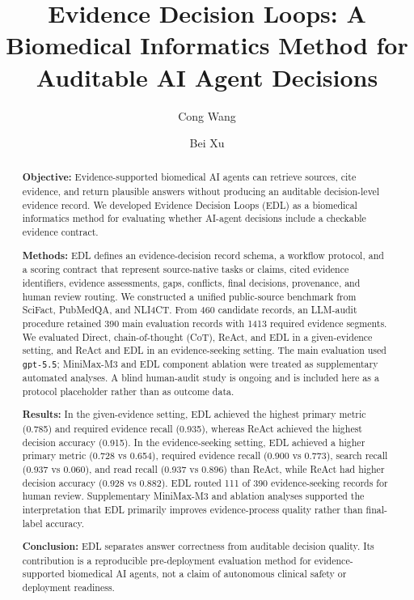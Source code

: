 \documentclass[11pt,a4paper]{article}
\title{Evidence Decision Loops: A Biomedical Informatics Method for Auditable AI Agent Decisions}
\author[1]{Cong Wang}
\author[2]{Bei Xu}
\affil[1]{Department of Cardiology, Zhongshan Hospital, Fudan University, Shanghai, China}
\affil[2]{Panvascular and Cardiac Rehabilitation Innovation Laboratory, Shanghai, China}
\date{}
\begin{document}
\maketitle

\begin{abstract}
\textbf{Objective:} Evidence-supported biomedical AI agents can retrieve sources, cite evidence, and return plausible answers without producing an auditable decision-level evidence record. We developed Evidence Decision Loops (EDL) as a biomedical informatics method for evaluating whether AI-agent decisions include a checkable evidence contract.

\textbf{Methods:} EDL defines an evidence-decision record schema, a workflow protocol, and a scoring contract that represent source-native tasks or claims, cited evidence identifiers, evidence assessments, gaps, conflicts, final decisions, provenance, and human review routing. We constructed a unified public-source benchmark from SciFact, PubMedQA, and NLI4CT. From 460 candidate records, an LLM-audit procedure retained 390 main evaluation records with 1413 required evidence segments. We evaluated Direct, chain-of-thought (CoT), ReAct, and EDL in a given-evidence setting, and ReAct and EDL in an evidence-seeking setting. The main evaluation used \texttt{gpt-5.5}; MiniMax-M3 and EDL component ablation were treated as supplementary automated analyses. A blind human-audit study is ongoing and is included here as a protocol placeholder rather than as outcome data.

\textbf{Results:} In the given-evidence setting, EDL achieved the highest primary metric (0.785) and required evidence recall (0.935), whereas ReAct achieved the highest decision accuracy (0.915). In the evidence-seeking setting, EDL achieved a higher primary metric (0.728 vs 0.654), required evidence recall (0.900 vs 0.773), search recall (0.937 vs 0.060), and read recall (0.937 vs 0.896) than ReAct, while ReAct had higher decision accuracy (0.928 vs 0.882). EDL routed 111 of 390 evidence-seeking records for human review. Supplementary MiniMax-M3 and ablation analyses supported the interpretation that EDL primarily improves evidence-process quality rather than final-label accuracy.

\textbf{Conclusion:} EDL separates answer correctness from auditable decision quality. Its contribution is a reproducible pre-deployment evaluation method for evidence-supported biomedical AI agents, not a claim of autonomous clinical safety or deployment readiness.
\end{abstract}
\end{document}
